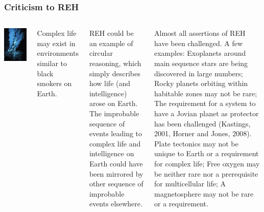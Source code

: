 \begin{frame}
\frametitle{Criticism to REH}

\begin{columns}

\includegraphics[scale=0.30]{geiser}

Complex life may exist in environments similar to black smokers on Earth.


REH could be an example of circular reasoning, which simply describes how life (and intelligence) arose on Earth. The improbable sequence of events leading to complex life and intelligence on Earth could have been mirrored by other sequence of improbable events elsewhere.  

Almost all assertions of REH have been challenged. A few examples: Exoplanets around main sequence stars are being discovered in large numbers; Rocky planets orbiting within habitable zones may not be rare; The requirement for a system to have a Jovian planet as protector has been challenged (Kastings, 2001, Horner and Jones, 2008). Plate tectonics may not be unique to Earth or a requirement for complex life; Free oxygen may be neither rare nor a prerequisite for multicellular life; A magnetosphere may not be rare or a requirement.
\end{columns}
\end{frame}

